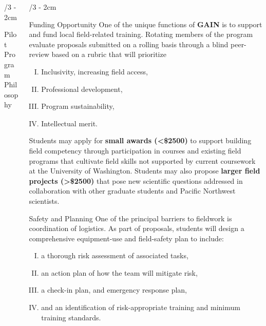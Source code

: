 \documentclass[landscape]{uwposter}
\begin{document}
\begin{frame}
\begin{columns}[onlytextwidth]
\begin{column}{\textwidth/3 - 2cm}
\begin{block}{Pilot Program Philosophy}
       
    \end{block}
    
\end{column}




\begin{column}{\textwidth/3 - 2cm}
    \begin{block}{Funding Opportunity}
        One of the unique functions of \textbf{\alert{GAIN}} is to support and fund local field-related training.
        Rotating members of the program evaluate proposals submitted on a rolling basis through a blind peer-review based on a rubric that will prioritize 
        \begin{enumerate}[I.]
        \item
        Inclusivity, increasing field access,
        \item
        Professional development,
        \item
        Program sustainability,
        \item
        Intellectual merit.
        \end{enumerate}

        Students may apply for \textbf{small awards (\alert{<\$2500})} to support building field competency through participation in courses and existing field programs that cultivate field skills not supported by current coursework at the University of Washington.
        Students may also propose \textbf{larger field projects (\alert{>\$2500})} that pose new scientific questions addressed in collaboration with other graduate students and Pacific Northwest scientists.
        

    \end{block}
    
    \begin{block}{Safety and Planning}
    One of the principal barriers to fieldwork is coordination of logistics.
    As part of proposals, students will design a comprehensive equipment-use and field-safety plan to include:
        \begin{enumerate}[I.]
         \item
    	a thorough risk assessment of associated tasks,
    	\item
	an action plan of how the team will mitigate risk,
    	\item
	a check-in plan, and emergency response plan,
    	\item
	and an identification of risk-appropriate training and minimum training standards.
	\end{enumerate}
	

\end{block}
\end{column}
\end{columns}
\end{frame}
\end{document}
